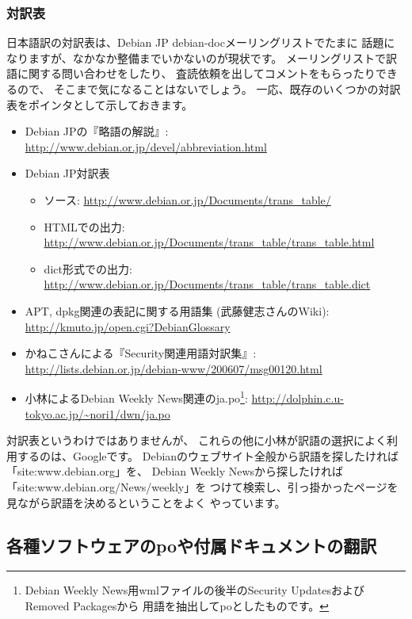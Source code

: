 \documentclass[mingoth,a4paper]{jsarticle}
\begin{document}
\subsubsection{対訳表}

日本語訳の対訳表は、Debian JP debian-docメーリングリストでたまに
話題になりますが、なかなか整備までいかないのが現状です。
メーリングリストで訳語に関する問い合わせをしたり、
査読依頼を出してコメントをもらったりできるので、
そこまで気になることはないでしょう。
一応、既存のいくつかの対訳表をポインタとして示しておきます。
\begin{itemize}
 \item Debian JPの『略語の解説』:
       \url{http://www.debian.or.jp/devel/abbreviation.html}
 \item Debian JP対訳表
       \begin{itemize}
	\item ソース: \url{http://www.debian.or.jp/Documents/trans_table/}
	\item HTMLでの出力:
	      \url{http://www.debian.or.jp/Documents/trans_table/trans_table.html}
	\item dict形式での出力:
	      \url{http://www.debian.or.jp/Documents/trans_table/trans_table.dict}
       \end{itemize}
 \item APT, dpkg関連の表記に関する用語集 (武藤健志さんのWiki):
       \url{http://kmuto.jp/open.cgi?DebianGlossary}
 \item かねこさんによる『Security関連用語対訳集』:
       \url{http://lists.debian.or.jp/debian-www/200607/msg00120.html}
 \item 小林によるDebian Weekly News関連のja.po\footnote{Debian Weekly
       News用wmlファイルの後半のSecurity UpdatesおよびRemoved Packagesから
       用語を抽出してpoとしたものです。}:
       \url{http://dolphin.c.u-tokyo.ac.jp/~nori1/dwn/ja.po}
\end{itemize}

対訳表というわけではありませんが、
これらの他に小林が訳語の選択によく利用するのは、Googleです。
Debianのウェブサイト全般から訳語を探したければ「site:www.debian.org」を、
Debian Weekly Newsから探したければ「site:www.debian.org/News/weekly」を
つけて検索し、引っ掛かったページを見ながら訳語を決めるということをよく
やっています。

\subsection{各種ソフトウェアのpoや付属ドキュメントの翻訳}
\end{document}
